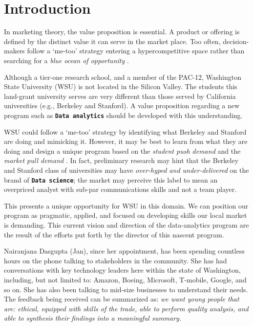 \documentclass[]{article}
\begin{document}
\section{Introduction}
\label{sec:intro}

\doublespacing

In marketing theory, the value proposition is essential. A product or
offering is defined by the distinct value it can serve in the market
place. Too often, decision-makers follow a `me-too' strategy entering a
hypercompetitive space rather than searching for a
\emph{blue ocean of opportunity} \citep{Kim:2014}.

Although a tier-one research school, and a member of the PAC-12,
Washington State University (WSU) is not located in the Silicon Valley.
The students this land-grant university serves are very different than
those served by California universities (e.g., Berkeley and Stanford). A
value proposition regarding a new program such as
\textbf{\tt{Data analytics}} should be developed with this
understanding.

WSU could follow a `me-too' strategy by identifying what Berkeley and
Stanford are doing and mimicking it. However, it may be best to learn
from what they are doing and design a unique program based on the
\emph{student push demand} and the \emph{market pull demand}
\citep{Baloglu:1996}. In fact, preliminary research may hint that the
Berkeley and Stanford class of universities may have
\emph{over-hyped and under-delivered} on the brand of
\textbf{\tt{Data science}}; the market may perceive this label to mean
an overpriced analyst with sub-par communications skills and not a team
player.

This presents a unique opportunity for WSU in this domain. We can
position our program as pragmatic, applied, and focused on developing
skills our local market is demanding. This current vision and direction
of the data-analytics program are the result of the efforts put forth by
the director of this nascent program.

Nairanjana Dasgupta (Jan), since her appointment, has been spending
countless hours on the phone talking to stakeholders in the community.
She has had conversations with key technology leaders here within the
state of Washington, including, but not limited to: Amazon, Boeing,
Microsoft, T-mobile, Google, and so on. She has also been talking to
mid-size businesses to understand their needs. The feedback being
received can be summarized as:
\emph{we want young people that are: ethical, equipped with skills of the trade, able to perform quality analysis, and able to synthesis their findings into a meaningful summary.}
\end{document}

